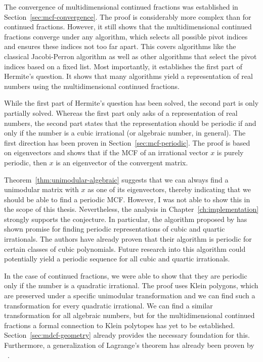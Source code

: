 The convergence of multidimensional continued fractions was established in Section~\ref{sec:mcf-convergence}.
The proof is considerably more complex than for continued fractions.
However, it still shows that the multidimensional continued fractions converge
under any algorithm, which selects all possible pivot indices and ensures these
indices not too far apart.
This covers algorithms like the classical Jacobi-Perron algorithm as well as
other algorithms that select the pivot indices based on a fixed list.
Most importantly, it establishes the first part of Hermite's question.
It shows that many algorithms yield a representation of real numbers
using the multidimensional continued fractions.

While the first part of Hermite's question has been solved,
the second part is only partially solved.
Whereas the first part only asks of a representation of real numbers,
the second part states that the representation should be periodic if and only
if the number is a cubic irrational (or algebraic number, in general).
The first direction has been proven in Section~\ref{sec:mcf-periodic}.
The proof is based on eigenvectors and shows that if the MCF of an irrational
vector $x$ is purely periodic, then $x$ is an eigenvector of the convergent
matrix.

Theorem~\ref{thm:unimodular-algebraic} suggests that we can always find a
unimodular matrix with $x$ as one of its eigenvectors,
thereby indicating that we should be able to find a periodic MCF.
However, I was not able to show this in the scope of this thesis.
Nevertheless, the analysis in Chapter~\ref{ch:implementation}
strongly supports the conjecture.
In particular, the algorithm proposed by \citeauthor{Tamura09} has shown promise for
finding periodic representations of cubic and quartic irrationals.
The authors have already proven that their algorithm is periodic for certain
classes of cubic polynomials.
Future research into this algorithm could potentially yield a periodic sequence
for all cubic and quartic irrationals.

In the case of continued fractions,
we were able to show that they are periodic only if the number is a quadratic irrational.
The proof uses Klein polygons, which are preserved under a specific unimodular transformation
and we can find such a transformation for every quadratic irrational.
We can find a similar transformation for all algebraic numbers, but for the
multidimensional continued fractions a formal connection to Klein polytopes has
yet to be established.
Section~\ref{sec:mdcf-geometry} already provides the necessary foundation for this.
Furthermore, a generalization of Lagrange's theorem has already been proven by
\citeauthor{German08}~\cite{German08}.

